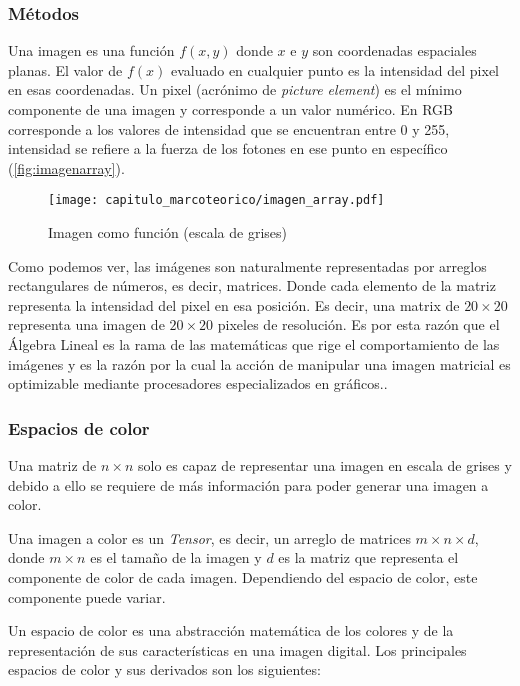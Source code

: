 \subsubsection{Métodos}

Una imagen es una función \(f(x,y)\) donde \(x\) e \(y\)
son coordenadas espaciales planas. El valor de \(f(x)\) evaluado en cualquier
punto es la intensidad del pixel en esas coordenadas. Un pixel (acrónimo de
\emph{picture element}) es el mínimo componente de una imagen y corresponde a un
valor numérico. En RGB corresponde a los valores de intensidad que se encuentran
entre 0 y 255, intensidad se refiere a la fuerza de los fotones en ese punto en
específico (\autoref{fig:imagenarray}).

\begin{figure}[H]
    \centering
    \texttt{[image: capitulo\_marcoteorico/imagen\_array.pdf]}
    \caption{Imagen como función (escala de grises)}\label{fig:imagenarray}
\end{figure}

Como podemos ver, las imágenes son naturalmente representadas por arreglos
rectangulares de números, es decir, matrices. Donde cada elemento de la matriz
representa la intensidad del pixel en esa posición. Es decir, una matrix de \(20
\times 20\) representa una imagen de \(20 \times 20\) pixeles de resolución. Es
por esta razón que el Álgebra Lineal es la rama de las matemáticas que rige el
comportamiento de las imágenes y es la razón por la cual la acción de manipular
una imagen matricial es optimizable mediante procesadores especializados en
gráficos..

\subsubsection{Espacios de color}

Una matriz de \(n \times n\) solo es capaz de representar una imagen en escala
de grises y debido a ello se requiere de más información para poder generar una
imagen a color.

Una imagen a color es un \emph{Tensor}, es decir, un arreglo de matrices \(m
\times n \times d\), donde \(m \times n\) es el tamaño de la imagen y \(d\) es
la matriz que representa el componente de color de cada imagen. Dependiendo del
espacio de color, este componente puede variar.

Un espacio de color es una abstracción matemática de los colores y de la
representación de sus características en una imagen digital. Los principales
espacios de color y sus derivados son los siguientes:

